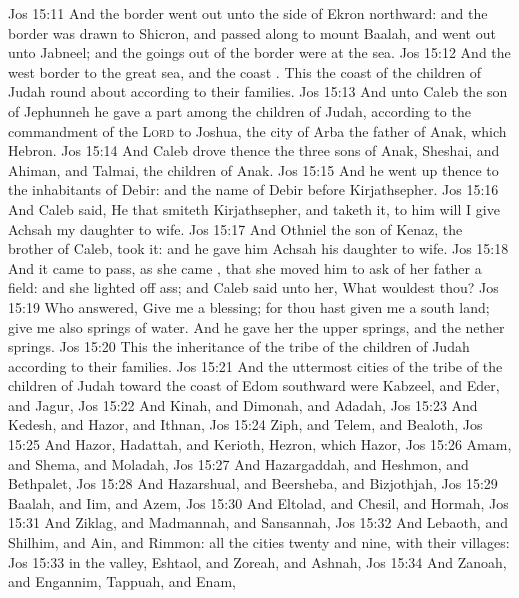 \vs Jos 15:11 And the border went out unto the side of Ekron northward: and the border was drawn to Shicron, and passed along to mount Baalah, and went out unto Jabneel; and the goings out of the border were at the sea.
\vs Jos 15:12 And the west border  to the great sea, and the coast . This  the coast of the children of Judah round about according to their families.
\vs Jos 15:13 And unto Caleb the son of Jephunneh he gave a part among the children of Judah, according to the commandment of the \textsc{Lord} to Joshua,  the city of Arba the father of Anak, which  Hebron.
\vs Jos 15:14 And Caleb drove thence the three sons of Anak, Sheshai, and Ahiman, and Talmai, the children of Anak.
\vs Jos 15:15 And he went up thence to the inhabitants of Debir: and the name of Debir before  Kirjathsepher.
\vs Jos 15:16 And Caleb said, He that smiteth Kirjathsepher, and taketh it, to him will I give Achsah my daughter to wife.
\vs Jos 15:17 And Othniel the son of Kenaz, the brother of Caleb, took it: and he gave him Achsah his daughter to wife.
\vs Jos 15:18 And it came to pass, as she came , that she moved him to ask of her father a field: and she lighted off  ass; and Caleb said unto her, What wouldest thou?
\vs Jos 15:19 Who answered, Give me a blessing; for thou hast given me a south land; give me also springs of water. And he gave her the upper springs, and the nether springs.
\vs Jos 15:20 This  the inheritance of the tribe of the children of Judah according to their families.
\vs Jos 15:21 And the uttermost cities of the tribe of the children of Judah toward the coast of Edom southward were Kabzeel, and Eder, and Jagur,
\vs Jos 15:22 And Kinah, and Dimonah, and Adadah,
\vs Jos 15:23 And Kedesh, and Hazor, and Ithnan,
\vs Jos 15:24 Ziph, and Telem, and Bealoth,
\vs Jos 15:25 And Hazor, Hadattah, and Kerioth,  Hezron, which  Hazor,
\vs Jos 15:26 Amam, and Shema, and Moladah,
\vs Jos 15:27 And Hazargaddah, and Heshmon, and Bethpalet,
\vs Jos 15:28 And Hazarshual, and Beersheba, and Bizjothjah,
\vs Jos 15:29 Baalah, and Iim, and Azem,
\vs Jos 15:30 And Eltolad, and Chesil, and Hormah,
\vs Jos 15:31 And Ziklag, and Madmannah, and Sansannah,
\vs Jos 15:32 And Lebaoth, and Shilhim, and Ain, and Rimmon: all the cities  twenty and nine, with their villages:
\vs Jos 15:33  in the valley, Eshtaol, and Zoreah, and Ashnah,
\vs Jos 15:34 And Zanoah, and Engannim, Tappuah, and Enam,
